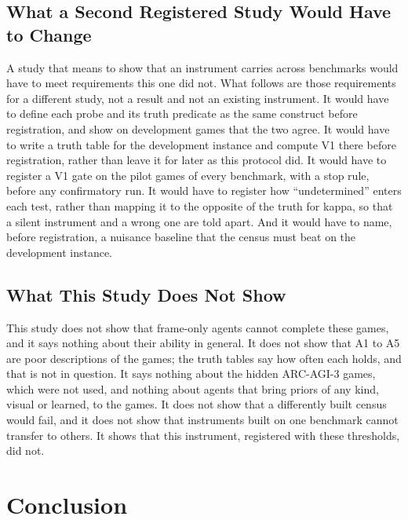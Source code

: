 \documentclass[twocolumn]{svjour3}
\begin{document}
\subsection{What a Second Registered Study Would Have to
Change}\label{sec:second}

A study that means to show that an instrument carries across benchmarks
would have to meet requirements this one did not. What follows are those
requirements for a different study, not a result and not an existing
instrument. It would have to define each probe and its truth predicate
as the same construct before registration, and show on development games
that the two agree. It would have to write a truth table for the
development instance and compute V1 there before registration, rather
than leave it for later as this protocol did. It would have to register
a V1 gate on the pilot games of every benchmark, with a stop rule,
before any confirmatory run. It would have to register how
``undetermined'' enters each test, rather than mapping it to the
opposite of the truth for kappa, so that a silent instrument and a wrong
one are told apart. And it would have to name, before registration, a
nuisance baseline that the census must beat on the development instance.

\subsection{What This Study Does Not Show}\label{sec:limits}

This study does not show that frame-only agents cannot complete these
games, and it says nothing about their ability in general. It does not
show that A1 to A5 are poor descriptions of the games; the truth tables
say how often each holds, and that is not in question. It says nothing
about the hidden ARC-AGI-3 games, which were not used, and nothing about
agents that bring priors of any kind, visual or learned, to the games.
It does not show that a differently built census would fail, and it does
not show that instruments built on one benchmark cannot transfer to
others. It shows that this instrument, registered with these thresholds,
did not.

\section{Conclusion}\label{sec:conclusion}
\end{document}
